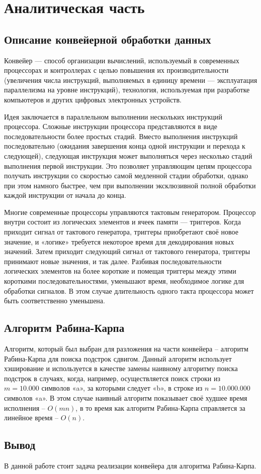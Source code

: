 \chapter{Аналитическая часть}

\section{Описание конвейерной обработки данных}

Конвейер\cite{conveyor} — способ организации вычислений, используемый в современных процессорах и контроллерах с целью повышения их производительности (увеличения числа инструкций, выполняемых в единицу времени — эксплуатация параллелизма на уровне инструкций), технология, используемая при разработке компьютеров и других цифровых электронных устройств.

Идея заключается в параллельном выполнении нескольких инструкций процессора. Сложные инструкции процессора представляются в виде последовательности более простых стадий. Вместо выполнения инструкций последовательно (ожидания завершения конца одной инструкции и перехода к следующей), следующая инструкция может выполняться через несколько стадий выполнения первой инструкции. Это позволяет управляющим цепям процессора получать инструкции со скоростью самой медленной стадии обработки, однако при этом намного быстрее, чем при выполнении эксклюзивной полной обработки каждой инструкции от начала до конца.

Многие современные процессоры управляются тактовым генератором. Процессор внутри состоит из логических элементов и ячеек памяти — триггеров. Когда приходит сигнал от тактового генератора, триггеры приобретают своё новое значение, и «логике» требуется некоторое время для декодирования новых значений. Затем приходит следующий сигнал от тактового генератора, триггеры принимают новые значения, и так далее. Разбивая последовательности логических элементов на более короткие и помещая триггеры между этими короткими последовательностями, уменьшают время, необходимое логике для обработки сигналов. В этом случае длительность одного такта процессора может быть соответственно уменьшена.

\section{Алгоритм Рабина-Карпа}

Алгоритм, который был выбран для разложения на части конвейера -- алгоритм Рабина-Карпа\cite{rabink} для поиска подстрок сдвигом. Данный алгоритм использует хэширование и используется в качестве замены наивному алгоритму поиска подстрок в случаях, когда, например, осуществляется поиск строки из $m = 10.000$ символов «a», за которыми следует «b», в строке из $n = 10.000.000$ символов «a». В этом случае наивный алгоритм показывает своё худшее время исполнения -- $O(mn)$, в то время как алгоритм Рабина-Карпа справляется за линейное время -- $O(n)$.

\section*{Вывод}
В данной работе стоит задача реализации конвейера для алгоритма Рабина-Карпа.

